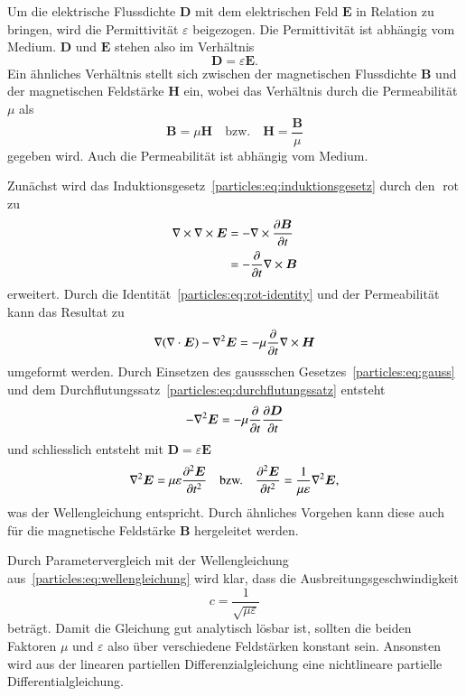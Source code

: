 Um die elektrische Flussdichte $\boldsymbol{D}$ mit dem elektrischen Feld $\boldsymbol{E}$ in Relation zu bringen, 
wird die Permittivität $\varepsilon$ beigezogen.
Die Permittivität ist abhängig vom Medium. 
$\boldsymbol{D}$ und $\boldsymbol{E}$ stehen also im Verhältnis
\begin{equation}
    \boldsymbol{D} = \varepsilon \boldsymbol{E}.
    \label{particles:eq:de}
\end{equation}
Ein ähnliches Verhältnis stellt sich zwischen der magnetischen Flussdichte $\boldsymbol{B}$ und der magnetischen Feldstärke $\boldsymbol{H}$ ein, wobei das Verhältnis durch die Permeabilität $\mu$ als
\begin{equation}
    \boldsymbol{B} = \mu \boldsymbol{H} \quad \text{bzw.} \quad \boldsymbol{H} = \frac{\boldsymbol{B}}{\mu}
    \label{particles:eq:bh}
\end{equation}
gegeben wird.
Auch die Permeabilität ist abhängig vom Medium.

Zunächst wird das Induktionsgesetz~\eqref{particles:eq:induktionsgesetz} durch den $\operatorname{rot}$ zu
\begin{align}
    \nabla \times \nabla \times \boldsymbol{E} 
        &= - \nabla \times \frac{\d\boldsymbol{B}}{\d t} \\
        &= - \frac{\d}{\d t} \nabla \times \boldsymbol{B}
\end{align}
erweitert.
Durch die Identität~\eqref{particles:eq:rot-identity} und der Permeabilität kann das Resultat zu
\[
    \nabla(\nabla \cdot \boldsymbol{E}) - \nabla^2 \boldsymbol{E} = -\mu \frac{\d}{\d t} \nabla \times \boldsymbol{H}
\]
umgeformt werden.
Durch Einsetzen des gaussschen Gesetzes~\eqref{particles:eq:gauss} und dem Durchflutungssatz~\eqref{particles:eq:durchflutungssatz} entsteht
\[
    - \nabla^2 \boldsymbol{E} = -\mu \frac{\d}{\d t} \frac{\d \boldsymbol{D}}{\d t}
\]
und schliesslich entsteht mit $\boldsymbol{D} = \varepsilon \boldsymbol{E}$
\[
    \nabla^2 \boldsymbol{E} = \mu\varepsilon \frac{\d^2 \boldsymbol{E}}{\d t^2} 
    \quad \text{bzw.} \quad
    \frac{\d^2 \boldsymbol{E}}{\d t^2} = \frac{1}{\mu \varepsilon} \nabla^2 \boldsymbol{E},
\]
was der Wellengleichung entspricht.
Durch ähnliches Vorgehen kann diese auch für die magnetische Feldstärke $\boldsymbol{B}$ hergeleitet werden.

Durch Parametervergleich mit der Wellengleichung aus~\eqref{particles:eq:wellengleichung} wird klar, dass die Ausbreitungsgeschwindigkeit
\[
    c = \frac{1}{\sqrt{\mu\varepsilon}}\label{particles:eq:lichtgeschwindigkeit}
\]
beträgt.
Damit die Gleichung gut analytisch lösbar ist, sollten die beiden Faktoren $\mu$ und $\varepsilon$ also über verschiedene Feldstärken konstant sein.
Ansonsten wird aus der linearen partiellen Differenzialgleichung eine nichtlineare partielle Differentialgleichung.


